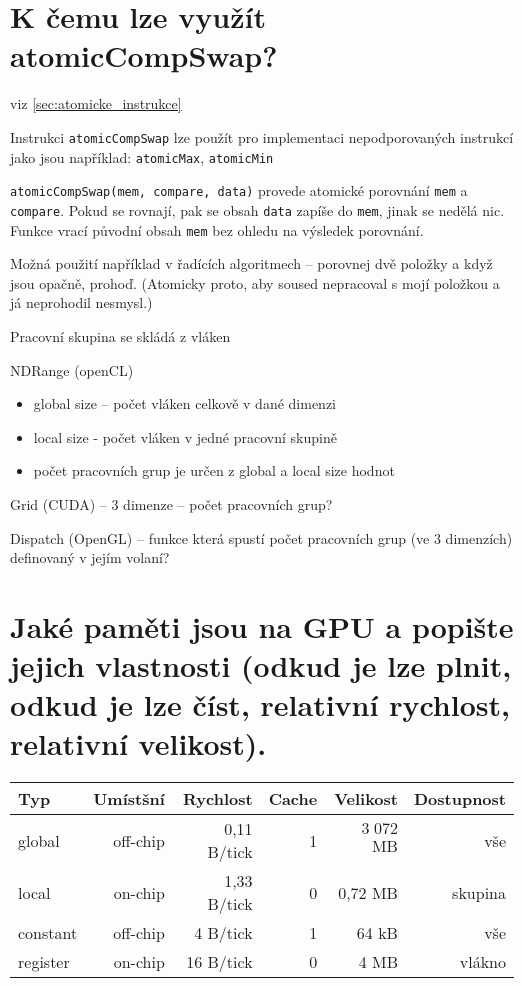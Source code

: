 \section{K čemu lze využít atomicCompSwap?}
	viz \ref{sec:atomicke_instrukce}
	
	Instrukci \texttt{atomicCompSwap} lze použít pro implementaci nepodporovaných instrukcí jako jsou například: \texttt{atomicMax}, \texttt{atomicMin}
	
	\texttt{atomicCompSwap(mem, compare, data)} provede atomické porovnání \texttt{mem} a \texttt{compare}. Pokud se rovnají, pak se obsah \texttt{data} zapíše do \texttt{mem}, jinak se nedělá nic. Funkce vrací původní obsah \texttt{mem} bez ohledu na výsledek porovnání.
	
	Možná použití například v řadících algoritmech -- porovnej dvě položky a když jsou opačně, prohoď. (Atomicky proto, aby soused nepracoval s mojí položkou a já neprohodil nesmysl.)	


	Pracovní skupina se skládá z vláken

	NDRange (openCL)
	\begin{itemize}
		\setlength\itemsep{0em}
		\item global size -- počet vláken celkově v dané dimenzi
		\item local size - počet vláken v jedné pracovní skupině
		\item počet pracovních grup je určen z global a local size hodnot
	\end{itemize}

	Grid (CUDA) -- 3 dimenze -- počet pracovních grup?

	Dispatch (OpenGL) -- funkce která spustí počet pracovních grup (ve 3 dimenzích) definovaný v jejím volaní?


\section{Jaké paměti jsou na GPU a popište jejich vlastnosti (odkud je lze plnit, odkud je lze číst, relativní rychlost, relativní velikost).}
	\begin{center}
		\begin{tabular}{l|rrrrr}
			\textbf{Typ} & \textbf{Umístšní} & \textbf{Rychlost} & \textbf{Cache} & \textbf{Velikost} & \textbf{Dostupnost} \\ \hline
			global       & off-chip          & 0,11 B/tick        & 1              & $3\;072$ MB           & vše \\
			local        & on-chip           & 1,33 B/tick       & 0              & 0,72 MB           & skupina \\
			constant     & off-chip          & 4 B/tick          & 1              & 64 kB             & vše \\
			register     & on-chip           & 16 B/tick         & 0              & 4 MB              & vlákno                                 
		\end{tabular}
	\end{center}

